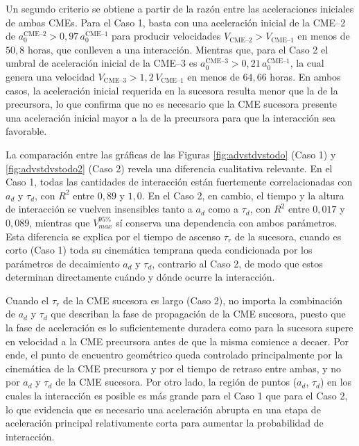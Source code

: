 Un segundo criterio se obtiene a partir de la razón entre las aceleraciones iniciales de ambas CMEs. Para el Caso 1, basta con una aceleración inicial de la CME--2 de $a_0^{\text{CME--2}}>0{,}97\,a_0^{\text{CME--1}}$ para producir velocidades $V_{\text{CME--2}}>V_{\text{CME--1}}$ en menos de $50{,}8$ horas, que conlleven a una interacción. Mientras que, para el Caso 2 el umbral de aceleración inicial de la CME--3 es $a_0^{\text{CME--3}}>0{,}21\,a_0^{\text{CME--1}}$, la cual genera una velocidad $V_{\text{CME--3}}>1{,}2\,V_{\text{CME--1}}$ en menos de $64{,}66$ horas. En ambos casos, la aceleración inicial requerida en la sucesora resulta menor que la de la precursora, lo que confirma que no es necesario que la CME sucesora presente una aceleración inicial mayor a la de la precursora para que la interacción sea favorable.

La comparación entre las gráficas de las Figuras \ref{fig:advstdvstodo} (Caso 1) y \ref{fig:advstdvstodo2} (Caso 2) revela una diferencia cualitativa relevante. En el Caso 1, todas las cantidades de interacción están fuertemente correlacionadas con $a_d$ y $\tau_d$, con $R^{2}$ entre $0{,}89$ y $1{,}0$. En el Caso 2, en cambio, el tiempo y la altura de interacción se vuelven insensibles tanto a $a_d$ como a $\tau_d$, con $R^{2}$ entre $0{,}017$ y $0{,}089$, mientras que $V_{max}^{95\%}$ sí conserva una dependencia con ambos parámetros. Esta diferencia se explica por el tiempo de ascenso $\tau_r$ de la sucesora, cuando es corto (Caso 1) toda su cinemática temprana queda condicionada por los parámetros de decaimiento $a_d$ y $\tau_d$, contrario al Caso 2, de modo que estos determinan directamente cuándo y dónde ocurre la interacción.

Cuando el $\tau_r$ de la CME sucesora es largo (Caso 2), no importa la combinación de $a_d$ y $\tau_d$ que describan la fase de propagación de la CME sucesora, puesto que la fase de aceleración es lo suficientemente duradera como para la sucesora supere en velocidad a la CME precursora antes de que la misma comience a decaer. Por ende, el punto de encuentro geométrico queda controlado principalmente por la cinemática de la CME precursora y por el tiempo de retraso entre ambas, y no por $a_d$ y $\tau_d$ de la CME sucesora. Por otro lado, la región de puntos ($a_d$, $\tau_d$) en los cuales la interacción es posible es más grande para el Caso 1 que para el Caso 2, lo que evidencia que es necesario una aceleración abrupta en una etapa de aceleración principal relativamente corta para aumentar la probabilidad de interacción.

